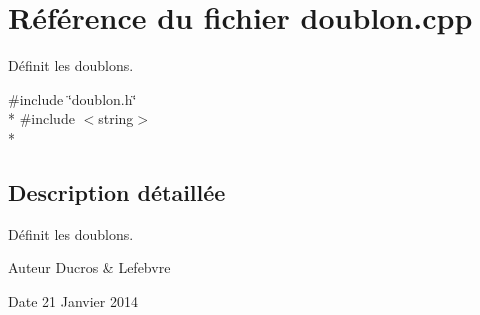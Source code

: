 \section{Référence du fichier doublon.\-cpp}
\label{doublon_8cpp}


Définit les doublons.  


{\ttfamily \#include \char`\"{}doublon.\-h\char`\"{}}\\*
{\ttfamily \#include $<$string$>$}\\*


\subsection{Description détaillée}
Définit les doublons. \begin{DoxyAuthor}{Auteur}
Ducros \& Lefebvre 
\end{DoxyAuthor}
\begin{DoxyDate}{Date}
21 Janvier 2014 
\end{DoxyDate}

